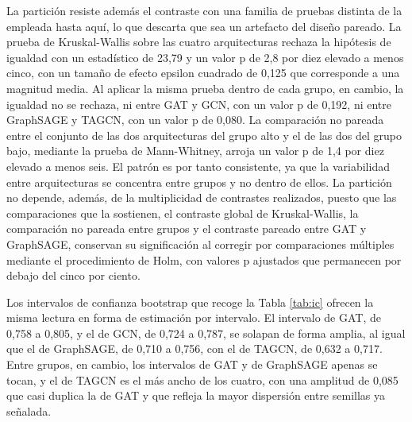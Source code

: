 La partición resiste además el contraste con una familia de pruebas distinta de la empleada hasta aquí, lo que descarta que sea un artefacto del diseño pareado. La prueba de Kruskal-Wallis sobre las cuatro arquitecturas rechaza la hipótesis de igualdad con un estadístico de 23,79 y un valor p de 2,8 por diez elevado a menos cinco, con un tamaño de efecto epsilon cuadrado de 0,125 que corresponde a una magnitud media. Al aplicar la misma prueba dentro de cada grupo, en cambio, la igualdad no se rechaza, ni entre GAT y GCN, con un valor p de 0,192, ni entre GraphSAGE y TAGCN, con un valor p de 0,080. La comparación no pareada entre el conjunto de las dos arquitecturas del grupo alto y el de las dos del grupo bajo, mediante la prueba de Mann-Whitney, arroja un valor p de 1,4 por diez elevado a menos seis. El patrón es por tanto consistente, ya que la variabilidad entre arquitecturas se concentra entre grupos y no dentro de ellos. La partición no depende, además, de la multiplicidad de contrastes realizados, puesto que las comparaciones que la sostienen, el contraste global de Kruskal-Wallis, la comparación no pareada entre grupos y el contraste pareado entre GAT y GraphSAGE, conservan su significación al corregir por comparaciones múltiples mediante el procedimiento de Holm, con valores p ajustados que permanecen por debajo del cinco por ciento.

Los intervalos de confianza bootstrap que recoge la Tabla \ref{tab:ic} ofrecen la misma lectura en forma de estimación por intervalo. El intervalo de GAT, de 0,758 a 0,805, y el de GCN, de 0,724 a 0,787, se solapan de forma amplia, al igual que el de GraphSAGE, de 0,710 a 0,756, con el de TAGCN, de 0,632 a 0,717. Entre grupos, en cambio, los intervalos de GAT y de GraphSAGE apenas se tocan, y el de TAGCN es el más ancho de los cuatro, con una amplitud de 0,085 que casi duplica la de GAT y que refleja la mayor dispersión entre semillas ya señalada.

